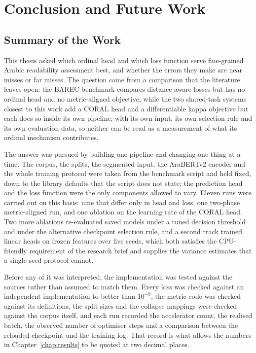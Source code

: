 \chapter{Conclusion and Future Work}
\label{chap:conclusion}

\section{Summary of the Work}

This thesis asked which ordinal head and which loss function serve fine-grained Arabic
readability assessment best, and whether the errors they make are near misses or far misses. The
question came from a comparison that the literature leaves open: the BAREC benchmark
\cite{elmadani2025barec} compares distance-aware losses but has no ordinal head and no
metric-aligned objective, while the two shared-task systems closest to this work add a CORAL
head \cite{nazzal2025zai} and a differentiable kappa objective \cite{trigui2025stbw} but each
does so inside its own pipeline, with its own input, its own selection rule and its own
evaluation data, so neither can be read as a measurement of what its ordinal mechanism
contributes.

The answer was pursued by building one pipeline and changing one thing at a time. The corpus,
the splits, the segmented input, the AraBERTv2 encoder and the whole training protocol were
taken from the benchmark script and held fixed, down to the library defaults that the script
does not state; the prediction head and the loss function were the only components allowed to
vary. Eleven runs were carried out on this basis: nine that differ only in head and loss, one
two-phase metric-aligned run, and one ablation on the learning rate of the CORAL head. Two more
ablations re-evaluated saved models under a tuned decision threshold and under the alternative
checkpoint selection rule, and a second track trained linear heads on frozen features over five
seeds, which both satisfies the CPU-friendly requirement of the research brief and supplies the
variance estimates that a single-seed protocol cannot.

Before any of it was interpreted, the implementation was tested against the sources rather than
assumed to match them. Every loss was checked against an independent implementation to better
than $10^{-9}$, the metric code was checked against its definitions, the split sizes and the
collapse mappings were checked against the corpus itself, and each run recorded the accelerator
count, the realised batch, the observed number of optimiser steps and a comparison between the
reloaded checkpoint and the training log. That record is what allows the numbers in
Chapter~\ref{chap:results} to be quoted at two decimal places.

